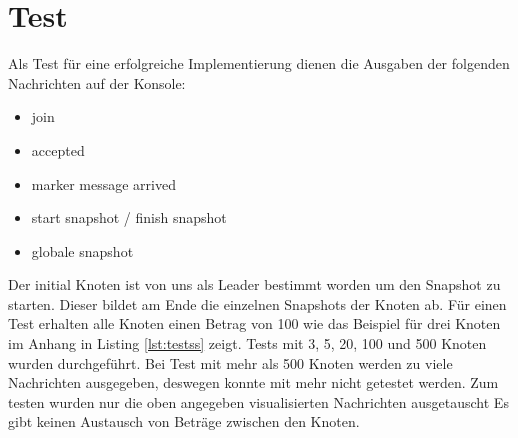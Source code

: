 \section{Test}
\label{sec:test}
Als Test für eine erfolgreiche Implementierung dienen die Ausgaben der
folgenden Nachrichten auf der Konsole:
\begin{itemize}
  \item join
  \item accepted
  \item marker message arrived
  \item start snapshot / finish snapshot
  \item globale snapshot
\end{itemize}

Der initial Knoten ist von uns als Leader bestimmt worden um den Snapshot zu starten.
Dieser bildet am Ende die einzelnen Snapshots der Knoten ab.
Für einen Test erhalten alle Knoten einen Betrag von 100 wie das Beispiel für 
drei Knoten im Anhang in Listing \ref{lst:testss} zeigt. Tests mit 3, 5, 20, 
100 und 500 Knoten wurden durchgeführt. Bei Test mit mehr als 500 Knoten werden
zu viele Nachrichten ausgegeben, deswegen konnte mit mehr nicht getestet werden.
Zum testen wurden nur die oben angegeben visualisierten Nachrichten ausgetauscht
Es gibt keinen Austausch von Beträge zwischen den Knoten.
